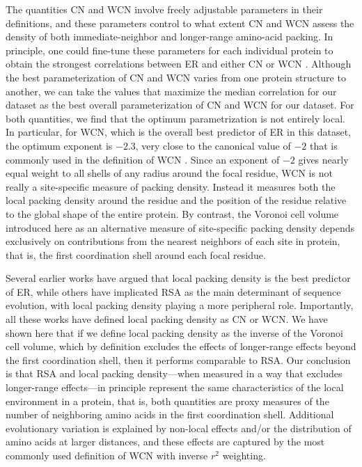 \documentclass[12pt]{article}
\begin{document}
   The quantities CN and WCN involve freely adjustable parameters in their definitions, and these parameters control to what extent CN and WCN assess the density of both immediate-neighbor and longer-range amino-acid packing. In principle, one could fine-tune these parameters for each individual protein to obtain the strongest correlations between ER and either CN or WCN \cite{yeh_local_2014}. Although the best parameterization of CN and WCN varies from one protein structure to another, we can take the values that maximize the median correlation for our dataset as the best overall parameterization of CN and WCN for our dataset. For both quantities, we find that the optimum parametrization is not entirely local. In particular, for WCN, which is the overall best predictor of ER in this dataset, the optimum exponent is $-2.3$, very close to the canonical value of $-2$ that is commonly used in the definition of WCN  \cite{lin_deriving_2008, yang_protein_2009, huang_mechanistic_2014, yeh_site-specific_2014, yeh_local_2014, marcos_too_2015}. Since an exponent of $-2$ gives nearly equal weight to all shells of any radius around the focal residue, WCN is not really a site-specific measure of packing density. Instead it measures both the local packing density around the residue and the position of the residue relative to the global shape of the entire protein. By contrast, the Voronoi cell volume introduced here as an alternative measure of site-specific packing density depends exclusively on contributions from the nearest neighbors of each site in protein, that is, the first coordination shell around each focal residue.

    Several earlier works \cite{yeh_local_2014, huang_mechanistic_2014} have argued that local packing density is the best predictor of ER, while others \cite{franzosa_structural_2009, shahmoradi_predicting_2014} have implicated RSA as the main determinant of sequence evolution, with local packing density playing a more  peripheral role. Importantly, all these works have defined local packing density as CN or WCN. We have shown here that if we define local packing density as the inverse of the Voronoi cell volume, which by definition excludes the effects of longer-range effects beyond the first coordination shell, then it performs comparable to RSA.  Our conclusion is that RSA and local packing density---when measured in a way that excludes longer-range effects---in principle represent the same characteristics of the local environment in a protein, that is, both quantities are proxy measures of the number of neighboring amino acids in the first coordination shell. Additional evolutionary variation is explained by non-local effects and/or the distribution of amino acids at larger distances, and these effects are captured by the most commonly used definition of WCN with inverse $r^2$ weighting.
    
\end{document}
